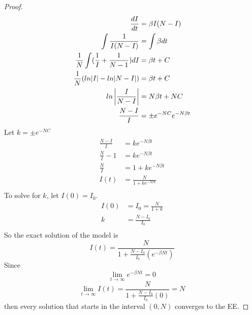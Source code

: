  \begin{proof}
    \begin{align*}
        \frac{dI}{dt}                                   &= \beta I(N-I)\\
        \int\frac{1}{I(N-I)}                            &= \int\beta dt\\
        \frac{1}{N}\int (\frac{1}{I} + \frac{1}{N-1})dI &= \beta t + C\\
        \frac{1}{N}(ln|I|- ln|N-I|)                     &= \beta t + C\\
        ln\left|\frac{I}{N-I}\right|                           &= N \beta t + NC\\
        \frac{N-I}{I}                                   &= \pm e^{-NC}e^{-N\beta t}\\
    \end{align*}
    Let $k = \pm e^{-NC}$\\
    \begin{align*}
        \frac{N-I}{I} 	  &= ke^{-N\beta t}\\
        \frac{N}{I} - 1   &= ke^{-N\beta t}\\
        \frac{N}{I} 	  &= 1 + ke^{-N\beta t}\\
        I(t) 			   &= \frac{N}{1 + ke^{-N\beta t}}\\
    \end{align*}
    To solve for $k$, let $I(0) = I_0$.\\
    \begin{align*}
        I(0) 	&= I_0 = \frac{N}{1 + k}\\
        k 		&= \frac{N - I_0}{I_0}\\
    \end{align*}
    So the exact solution of the model is
    \begin{equation}
        I(t) =  \frac{N}{1+\frac{N-I_0}{I_0}(e^{-\beta N t})}
    \end{equation}
    Since
    $$\lim_{t\to\infty} e^{-\beta N t} = 0$$
    $$\lim_{t\to\infty} I(t) = \frac{N}{1 +\frac{N-I_0}{I_0}(0)} = N$$
    then every solution that starts in the interval $(0, N)$ converges to the EE.
\end{proof}

